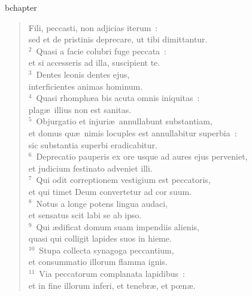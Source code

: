 bchapter\begin{verse}\vspace{-19pt}Fili, peccasti, non adjicias iterum~:\\ sed et de pristinis deprecare, ut tibi dimittantur.\\
${}^{2}$~Quasi a facie colubri fuge peccata~:\\ et si accesseris ad illa, suscipient te.\\
${}^{3}$~Dentes leonis dentes ejus,\\ interficientes animas hominum.\\
${}^{4}$~Quasi rhomph\ae a bis acuta omnis iniquitas~:\\ plag\ae\ illius non est sanitas.\\
${}^{5}$~Objurgatio et injuri\ae\ annullabunt substantiam,\\ et domus qu\ae\ nimis locuples est annullabitur superbia~:\\ sic substantia superbi eradicabitur.\\
${}^{6}$~Deprecatio pauperis ex ore usque ad aures ejus perveniet,\\ et judicium festinato adveniet illi.\\
${}^{7}$~Qui odit correptionem vestigium est peccatoris,\\ et qui timet Deum convertetur ad cor suum.\\
${}^{8}$~Notus a longe potens lingua audaci,\\ et sensatus scit labi se ab ipso.\\
${}^{9}$~Qui \ae dificat domum suam impendiis alienis,\\ quasi qui colligit lapides suos in hieme.\\
${}^{10}$~Stupa collecta synagoga peccantium,\\ et consummatio illorum flamma ignis.\\
${}^{11}$~Via peccatorum complanata lapidibus~:\\ et in fine illorum inferi, et tenebr\ae , et pœn\ae .\end{verse}


